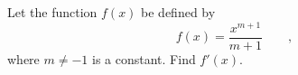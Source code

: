 Let the function $f(x)$ be defined by 
\begin{equation*}
  f(x) = \frac{x^{m+1}}{m+1}\qquad ,
\end{equation*}
where $m\ne -1$ is a constant. Find $f'(x)$.\answercheck
